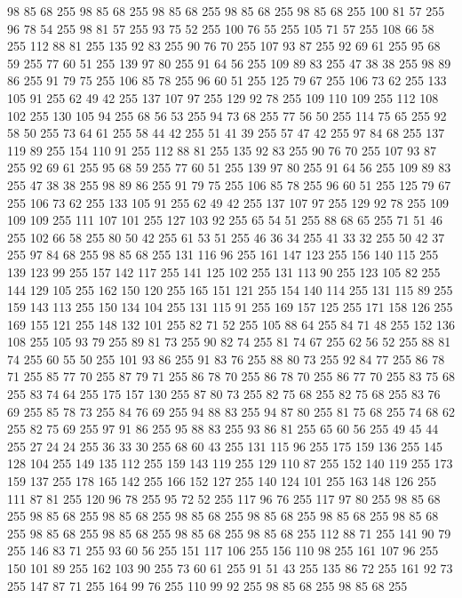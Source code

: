 98 85 68 255 98 85 68 255 98 85 68 255 98 85 68 255 98 85 68 255 100 81 57 255 96 78 54 255 98 81 57 255 93 75 52 255 100 76 55 255 105 71 57 255 108 66 58 255 112 88 81 255 135 92 83 255 90 76 70 255 107 93 87 255 92 69 61 255 95 68 59 255 77 60 51 255 139 97 80 255 91 64 56 255 109 89 83 255 47 38 38 255 98 89 86 255 91 79 75 255 106 85 78 255 96 60 51 255 125 79 67 255 106 73 62 255 133 105 91 255 62 49 42 255 137 107 97 255 129 92 78 255 109 110 109 255 112 108 102 255 130 105 94 255 68 56 53 255 94 73 68 255 77 56 50 255 114 75 65 255 92 58 50 255 73 64 61 255 58 44 42 255 51 41 39 255 57 47 42 255 97 84 68 255 137 119 89 255 154 110 91 255 112 88 81 255 135 92 83 255 90 76 70 255 107 93 87 255 92 69 61 255 95 68 59 255 77 60 51 255 139 97 80 255 91 64 56 255 109 89 83 255 47 38 38 255 98 89 86 255 91 79 75 255 106 85 78 255 96 60 51 255 125 79 67 255
106 73 62 255 133 105 91 255 62 49 42 255 137 107 97 255 129 92 78 255 109 109 109 255 111 107 101 255 127 103 92 255 65 54 51 255 88 68 65 255 71 51 46 255 102 66 58 255 80 50 42 255 61 53 51 255 46 36 34 255 41 33 32 255 50 42 37 255 97 84 68 255 98 85 68 255 131 116 96 255 161 147 123 255 156 140 115 255 139 123 99 255 157 142 117 255 141 125 102 255 131 113 90 255 123 105 82 255 144 129 105 255 162 150 120 255 165 151 121 255 154 140 114 255 131 115 89 255 159 143 113 255 150 134 104 255 131 115 91 255 169 157 125 255 171 158 126 255 169 155 121 255 148 132 101 255 82 71 52 255 105 88 64 255 84 71 48 255 152 136 108 255 105 93 79 255 89 81 73 255 90 82 74 255 81 74 67 255 62 56 52 255 88 81 74 255 60 55 50 255 101 93 86 255 91 83 76 255 88 80 73 255 92 84 77 255 86 78 71 255 85 77 70 255 87 79 71 255 86 78 70 255 86 78 70 255 86 77 70 255 83 75 68 255 83 74 64 255 175 157 130 255 87 80 73 255
82 75 68 255 82 75 68 255 83 76 69 255 85 78 73 255 84 76 69 255 94 88 83 255 94 87 80 255 81 75 68 255 74 68 62 255 82 75 69 255 97 91 86 255 95 88 83 255 93 86 81 255 65 60 56 255 49 45 44 255 27 24 24 255 36 33 30 255 68 60 43 255 131 115 96 255 175 159 136 255 145 128 104 255 149 135 112 255 159 143 119 255 129 110 87 255 152 140 119 255 173 159 137 255 178 165 142 255 166 152 127 255 140 124 101 255 163 148 126 255 111 87 81 255 120 96 78 255 95 72 52 255 117 96 76 255 117 97 80 255 98 85 68 255 98 85 68 255 98 85 68 255 98 85 68 255 98 85 68 255 98 85 68 255 98 85 68 255 98 85 68 255 98 85 68 255 98 85 68 255 98 85 68 255 112 88 71 255 141 90 79 255 146 83 71 255 93 60 56 255 151 117 106 255 156 110 98 255 161 107 96 255 150 101 89 255 162 103 90 255 73 60 61 255 91 51 43 255 135 86 72 255 161 92 73 255 147 87 71 255 164 99 76 255 110 99 92 255 98 85 68 255 98 85 68 255
